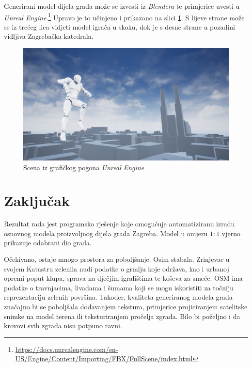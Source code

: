 \documentclass[times, utf8, zavrsni, numeric]{fer}
\begin{document}
	Generirani model dijela grada može se izvesti  iz \textit{Blendera} te primjerice uvesti  u \textit{Unreal Engine}.\footnote{\url{https://docs.unrealengine.com/en-US/Engine/Content/Importing/FBX/FullScene/index.html}}
	Upravo je to učinjeno i prikazano na slici \ref{fig:ue4_game_jumping}.
	S lijeve strane može se iz trećeg lica vidjeti model igrača u skoku, dok je s desne strane u pozadini vidljiva Zagrebačka katedrala.
	
	\begin{figure}[H]
		\includegraphics[width=\linewidth]{figures/ue4_game_jumping.jpg}
		\centering
		\caption{Scena iz grafičkog pogona \textit{Unreal Engine}}
		\label{fig:ue4_game_jumping}
	\end{figure}



\chapter{Zaključak}
	
	Rezultat rada jest programsko rješenje koje omogućuje automatiziranu izradu osnovnog modela proizvoljnog dijela grada Zagreba.
	Model u omjeru $1:1$ vjerno prikazuje odabrani dio grada.
	
	Očekivano, ostaje mnogo prostora za poboljšanje.
	Osim stabala, Zrinjevac u svojem Katastru zelenila nudi podatke o grmlju koje održava, kao i urbanoj opremi poput klupa, sprava na dječjim igralištima te koševa za smeće.
	OSM ima podatke o travnjacima, livadama i šumama koji se mogu iskoristiti za točniju reprezentaciju zelenih površina.
	Također, kvaliteta generiranog modela grada značajno bi se poboljšala dodavanjem tekstura, primjerice projiciranjem satelitske snimke na model terena ili teksturiranjem pročelja zgrada.
	Bilo bi poželjno i da krovovi svih zgrada nisu potpuno ravni.
	
\end{document}
